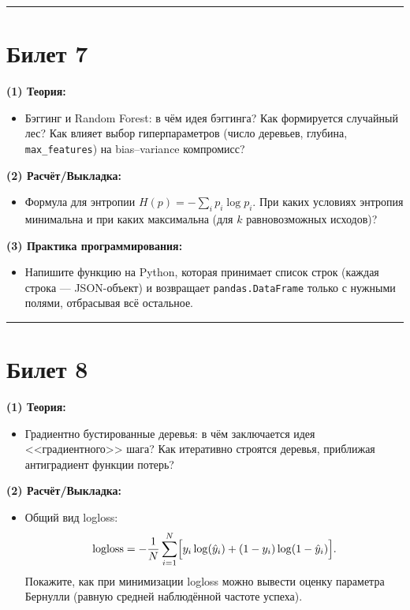 \documentclass[a4paper,12pt]{article}
\begin{document}
\noindent\rule{\textwidth}{0.4pt}
\newpage

\section*{Билет 7}
\textbf{(1) Теория:}
\begin{itemize}
  \item Бэггинг и Random Forest: в чём идея бэггинга? Как формируется случайный лес? Как влияет выбор гиперпараметров (число деревьев, глубина, \texttt{max\_features}) на bias--variance компромисс?
\end{itemize}

\textbf{(2) Расчёт/Выкладка:}
\begin{itemize}
  \item Формула для энтропии $H(p) = -\sum_i p_i \log p_i$. При каких условиях энтропия минимальна и при каких максимальна (для $k$ равновозможных исходов)?
\end{itemize}

\textbf{(3) Практика программирования:}
\begin{itemize}
  \item Напишите функцию на Python, которая принимает список строк (каждая строка --- JSON-объект) и возвращает \texttt{pandas.DataFrame} только с нужными полями, отбрасывая всё остальное.
\end{itemize}

\noindent\rule{\textwidth}{0.4pt}

\section*{Билет 8}
\textbf{(1) Теория:}
\begin{itemize}
  \item Градиентно бустированные деревья: в чём заключается идея <<градиентного>> шага? Как итеративно строятся деревья, приближая антиградиент функции потерь?
\end{itemize}

\textbf{(2) Расчёт/Выкладка:}
\begin{itemize}
  \item Общий вид logloss:
    \[
      \text{logloss} = -\frac{1}{N}\sum_{i=1}^N \Bigl[ y_i \log(\hat{y}_i) + (1-y_i)\log(1-\hat{y}_i) \Bigr].
    \]
    Покажите, как при минимизации logloss можно вывести оценку параметра Бернулли (равную средней наблюдённой частоте успеха).
\end{itemize}
\end{document}
